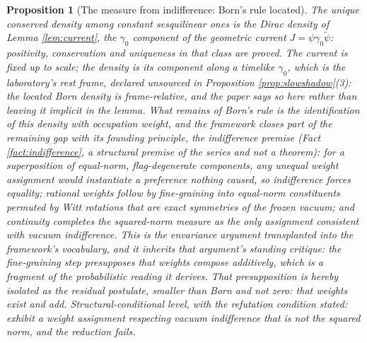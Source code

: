 \documentclass[11pt]{article}
\newtheorem{proposition}[theorem]{Proposition}
\theoremstyle{definition}
\begin{document}
\begin{proposition}[The measure from indifference: Born's rule located]\label{prop:born}
The unique conserved density among constant sesquilinear ones is the Dirac density of Lemma \ref{lem:current}, the $\gamma_{0}$ component of the geometric current $J = \psi\gamma_{0}\tilde{\psi}$: positivity, conservation and uniqueness in that class are proved. The current is fixed up to scale; the \emph{density} is its component along a timelike $\gamma_{0}$, which is the laboratory's rest frame, declared unsourced in Proposition \ref{prop:slowshadow}(3): the located Born density is frame-relative, and the paper says so here rather than leaving it implicit in the lemma. What remains of Born's rule is the identification of this density with occupation weight, and the framework closes part of the remaining gap with its founding principle, the indifference premise (Fact \ref{fact:indifference}, a structural premise of the series and not a theorem): for a superposition of equal-norm, flag-degenerate components, any unequal weight assignment would instantiate a preference nothing caused, so indifference forces equality; rational weights follow by fine-graining into equal-norm constituents permuted by Witt rotations that are exact symmetries of the frozen vacuum; and continuity completes the squared-norm measure as the only assignment consistent with vacuum indifference. This is the envariance argument \cite{Zurek2005} transplanted into the framework's vocabulary, and it inherits that argument's standing critique: the fine-graining step presupposes that weights compose additively, which is a fragment of the probabilistic reading it derives. That presupposition is hereby isolated as the residual postulate, smaller than Born and not zero: \emph{that weights exist and add}. Structural-conditional level, with the refutation condition stated: exhibit a weight assignment respecting vacuum indifference that is not the squared norm, and the reduction fails.
\end{proposition}
\end{document}

